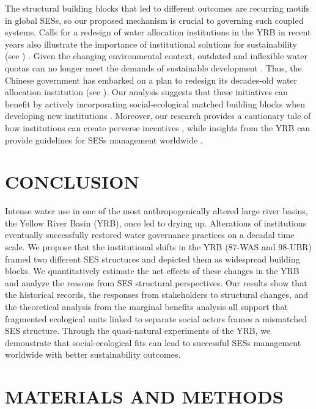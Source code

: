 \documentclass[default, sn-standardnature]{sn-jnl}
\begin{document}
The structural building blocks that led to different outcomes are recurring motifs in global SESs, so our proposed mechanism is crucial to governing such coupled systems.
Calls for a redesign of water allocation institutions in the YRB in recent years also illustrate the importance of institutional solutions for sustainability (see \textit{}) \cite{yu2019}.
Given the changing environmental context, outdated and inflexible water quotas can no longer meet the demands of sustainable development \cite{wang2019a}.
Thus, the Chinese government has embarked on a plan to redesign its decades-old water allocation institution (see \textit{}).
Our analysis suggests that these initiatives can benefit by actively incorporating social-ecological matched building blocks when developing new institutions \cite{bodin2017b}.
Moreover, our research provides a cautionary tale of how institutions can create perverse incentives \cite{hegwood2022}, while insights from the YRB can provide guidelines for SESs management worldwide \cite{muneepeerakul2017, leslie2015}.


\section{CONCLUSION}\label{sec:conclusion}

Intense water use in one of the most anthropogenically altered large river basins, the Yellow River Basin (YRB), once led to drying up.
Alterations of institutions eventually successfully restored water governance practices on a decadal time scale.
We propose that the institutional shifts in the YRB (87-WAS and 98-UBR) framed two different SES structures and depicted them as widespread building blocks.
We quantitatively estimate the net effects of these changes in the YRB and analyze the reasons from SES structural perspectives.
Our results show that the historical records, the responses from stakeholders to structural changes, and the theoretical analysis from the marginal benefits analysis all support that fragmented ecological units linked to separate social actors frames a mismatched SES structure.
Through the quasi-natural experiments of the YRB, we demonstrate that social-ecological fits can lead to successful SESs management worldwide with better sustainability outcomes.


\section{MATERIALS AND METHODS}\label{sec:methods}
\end{document}
